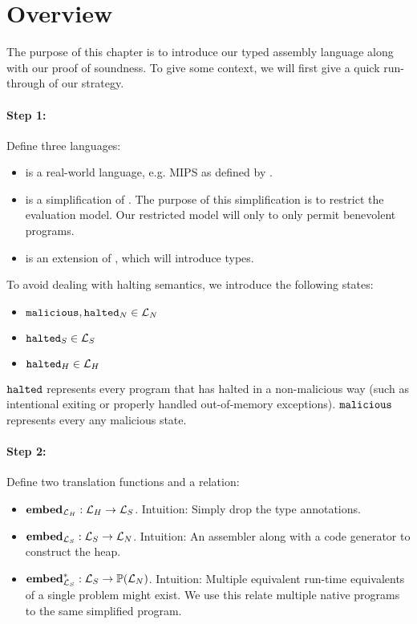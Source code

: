 \section{Overview}

The purpose of this chapter is to introduce our typed assembly language along
with our proof of soundness. To give some context, we will first give a quick
run-through of our strategy.

\paragraph{Step 1:} Define three languages:

\begin{itemize}
\item \nativelang is a real-world language, e.g. MIPS as defined by
  \cite{mipssys}.
\item \simplelang is a simplification of \nativelang. The purpose of
  this simplification is to restrict the evaluation model. Our restricted model
  will only to only permit benevolent programs.
\item \highlang is an extension of \simplelang, which will
  introduce types.
\end{itemize}

To avoid dealing with halting semantics, we introduce the following states:
\begin{itemize}
\item ${\mathtt{malicious}}, {\mathtt{halted}_N} \in \mathcal{L}_N$
\item ${\mathtt{halted}_S} \in \mathcal{L}_S$
\item ${\mathtt{halted}_H} \in \mathcal{L}_H$
\end{itemize}

$\mathtt{halted}$ represents every program that has halted in a non-malicious way (such as
intentional exiting or properly handled out-of-memory exceptions). ${\mathtt{malicious}}$
represents every any malicious state.

\paragraph{Step 2:} Define two translation functions and a relation:

\begin{itemize}
\item ${\mathbf{embed}}_{\mathcal{L}_H} : \mathcal{L}_H -> \mathcal{L}_S$. Intuition: Simply drop the type
  annotations.
\item ${\mathbf{embed}}_{\mathcal{L}_S} : \mathcal{L}_S -> \mathcal{L}_N$. Intuition: An assembler
  along with a code generator to construct the heap.
\item $\mathbf{embed}^\ast_{\mathcal{L}_S} : \mathcal{L}_S -> \mathbb{P}(\mathcal{L}_N)$. Intuition:
  Multiple equivalent run-time equivalents of a single problem might exist. We
  use this relate multiple native programs to the same simplified program.
\end{itemize}

